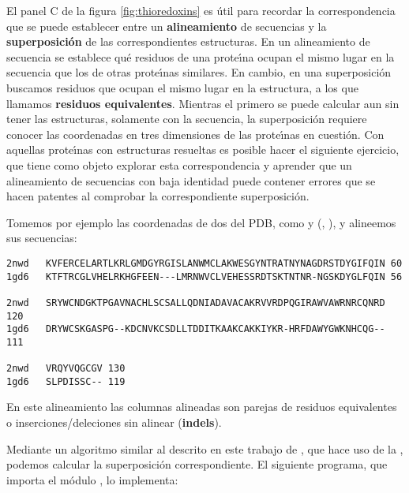El panel C de la figura \ref{fig:thioredoxins} es \'{u}til para recordar la correspondencia que se puede establecer 
entre un \textbf{alineamiento} de secuencias y la \textbf{superposici\'{o}n} de las correspondientes estructuras. 
En un alineamiento de secuencia se establece qu\'{e} residuos de una prote\'\i{}na ocupan el mismo lugar en la secuencia
que los de otras prote\'\i{}nas similares. 
En cambio, en una superposici\'{o}n buscamos residuos que ocupan el mismo lugar en la estructura, a los que llamamos  
\textbf{residuos equivalentes}.
Mientras el primero se puede calcular aun sin tener las estructuras, solamente con la secuencia, la superposici\'{o}n
requiere conocer las coordenadas en tres dimensiones de las prote\'\i{}nas en cuesti\'{o}n.
Con aquellas prote\'\i{}nas con estructuras resueltas es posible hacer el siguiente ejercicio,
que tiene como objeto explorar esta correspondencia y aprender que un alineamiento de secuencias con baja identidad
puede contener errores que se hacen patentes al comprobar la correspondiente superposici\'{o}n.


Tomemos por ejemplo las coordenadas de dos 
 del PDB, como
 y 
(,
), 
y alineemos sus secuencias:
\begin{verbatim}
2nwd   KVFERCELARTLKRLGMDGYRGISLANWMCLAKWESGYNTRATNYNAGDRSTDYGIFQIN 60
1gd6   KTFTRCGLVHELRKHGFEEN---LMRNWVCLVEHESSRDTSKTNTNR-NGSKDYGLFQIN 56

2nwd   SRYWCNDGKTPGAVNACHLSCSALLQDNIADAVACAKRVVRDPQGIRAWVAWRNRCQNRD 120
1gd6   DRYWCSKGASPG--KDCNVKCSDLLTDDITKAAKCAKKIYKR-HRFDAWYGWKNHCQG-- 111

2nwd   VRQYVQGCGV 130
1gd6   SLPDISSC-- 119
\end{verbatim}

En este alineamiento las columnas alineadas son parejas de residuos equivalentes o
inserciones/deleciones sin alinear (\textbf{indels}).

Mediante un algoritmo similar al descrito en este %
trabajo de \citet{McLachlan1979}, que hace uso de la 
,
podemos calcular la superposici\'{o}n correspondiente. El siguiente programa, que importa
el m\'{o}dulo , lo implementa:


